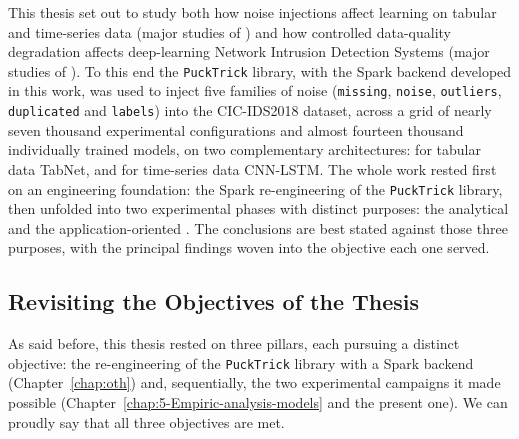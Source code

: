 \documentclass[../main.tex]{subfiles}
\begin{document}
This thesis set out to study both how noise injections affect learning on tabular and time-series data (major studies of ) and how controlled data-quality degradation affects deep-learning Network Intrusion Detection Systems (major studies of ). To this end the \texttt{PuckTrick} library, with the Spark backend developed in this work, was used to inject five families of noise (\texttt{missing}, \texttt{noise}, \texttt{outliers}, \texttt{duplicated} and \texttt{labels}) into the CIC-IDS2018 dataset, across a grid of nearly seven thousand experimental configurations and almost fourteen thousand individually trained models, on two complementary architectures: for tabular data TabNet, and for time-series data CNN-LSTM. The whole work rested first on an engineering foundation: the Spark re-engineering of the \texttt{PuckTrick} library, then unfolded into two experimental phases with distinct purposes: the analytical  and the application-oriented . The conclusions are best stated against those three purposes, with the principal findings woven into the objective each one served.

\subsection{Revisiting the Objectives of the Thesis}
\label{sec:obj-revisited}

As said before, this thesis rested on three pillars, each pursuing a distinct objective: the re-engineering of the \texttt{PuckTrick} library with a Spark backend (Chapter~\ref{chap:oth}) and, sequentially, the two experimental campaigns it made possible (Chapter~\ref{chap:5-Empiric-analysis-models} and the present one). We can proudly say that all three objectives are met.
\end{document}
